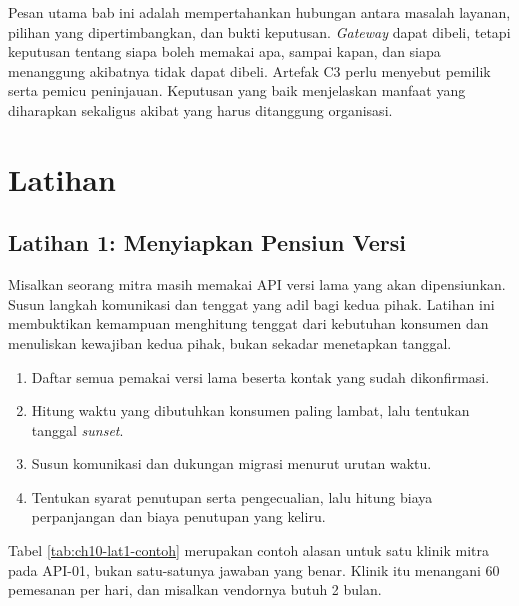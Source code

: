 Pesan utama bab ini adalah mempertahankan hubungan antara masalah layanan, pilihan yang dipertimbangkan, dan bukti
keputusan. \textit{Gateway} dapat dibeli, tetapi keputusan tentang siapa boleh memakai apa, sampai kapan, dan siapa
menanggung akibatnya tidak dapat dibeli. Artefak C3 perlu menyebut pemilik serta pemicu peninjauan. Keputusan yang baik
menjelaskan manfaat yang diharapkan sekaligus akibat yang harus ditanggung organisasi.

\section{Latihan}

\subsection*{Latihan 1: Menyiapkan Pensiun Versi}

Misalkan seorang mitra masih memakai API versi lama yang akan dipensiunkan. Susun langkah komunikasi dan tenggat yang
adil bagi kedua pihak. Latihan ini membuktikan kemampuan menghitung tenggat dari kebutuhan konsumen dan menuliskan
kewajiban kedua pihak, bukan sekadar menetapkan tanggal.

\begin{enumerate}
  \item Daftar semua pemakai versi lama beserta kontak yang sudah dikonfirmasi.
  \item Hitung waktu yang dibutuhkan konsumen paling lambat, lalu tentukan tanggal \textit{sunset}.
  \item Susun komunikasi dan dukungan migrasi menurut urutan waktu.
  \item Tentukan syarat penutupan serta pengecualian, lalu hitung biaya perpanjangan dan biaya penutupan yang keliru.
\end{enumerate}

Tabel \ref{tab:ch10-lat1-contoh} merupakan contoh alasan untuk satu klinik mitra pada API-01, bukan satu-satunya jawaban
yang benar. Klinik itu menangani 60 pemesanan per hari, dan misalkan vendornya butuh 2 bulan.

